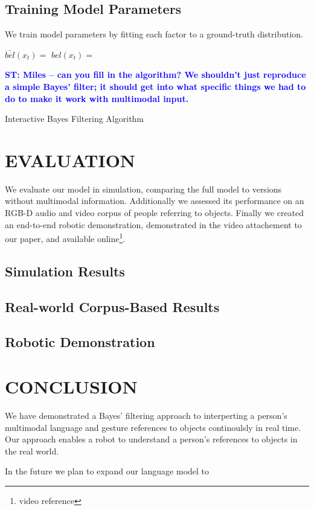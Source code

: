 \documentclass[letterpaper, 10 pt, conference]{ieeeconf}
\newcommand{\stnote}[1]{\textcolor{Blue}{\textbf{ST: #1}}}
\begin{document}
\subsection{Training Model Parameters}

We train model parameters by fitting each factor to a ground-truth
distribution.

\begin{algorithm}
    \DontPrintSemicolon
    \BlankLine
    \BlankLine
     {
      $\bar{bel}(x_t) = $
      \BlankLine
      $bel(x_t) = $

    }
    \BlankLine
      \stnote{Miles -- can you fill in the algorithm?  We shouldn't just reproduce a simple Bayes' filter; it should get into what specific things we had to do to make it work with multimodal input.}
\caption{Interactive Bayes Filtering Algorithm} 
\label{alg:algorithm}
\end{algorithm}



\section{EVALUATION}

We evaluate our model in simulation, comparing the full model to
versions without multimodal information.  Additionally we assessed its
performance on an RGB-D audio and video corpus of people referring to
objects.  Finally we created an end-to-end robotic demonstration,
demonstrated in the video attachement to our paper, and available
online\footnote{video reference}. 

\subsection{Simulation Results}

\subsection{Real-world Corpus-Based Results}

\subsection{Robotic Demonstration}

\section{CONCLUSION}

We have demonstrated a Bayes' filtering approach to interperting a
person's multimodal language and gesture references to objects
continoulsly in real time.  Our approach enables a robot to understand
a person's references to objects in the real world.

In the future we plan to expand our language model to




\end{document}
